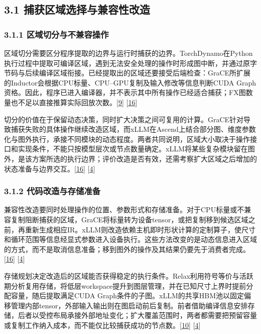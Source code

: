 \documentclass[
  11pt,
  UTF8]{ctexart}
\begin{document}
\hypertarget{section-3-1}{%
\subsection{3.1 捕获区域选择与兼容性改造}\label{section-3-1}}

\hypertarget{section-3-1-1}{%
\subsubsection{3.1.1 区域切分与不兼容操作}\label{section-3-1-1}}

区域切分需要区分程序提取的边界与运行时捕获的边界。TorchDynamo在Python执行过程中提取可编译区域，遇到无法安全处理的操作时形成图中断，并通过原字节码与后续编译区域衔接。已经提取出的区域还要接受后端检查：GraCE所扩展的Inductor会根据CPU标量、CPU--GPU复制及输入修改等信息判断CUDA
Graph资格。因此，程序已进入编译器，并不表示其中所有操作已经适合捕获；FX图数量也不足以直接推算实际回放次数。{[}\protect\hyperlink{ref-ansel2024pytorch2}{9}{]}
{[}\protect\hyperlink{ref-ghosh2026grace}{16}{]}

切分的价值在于保留动态决策，同时扩大决策之间可复用的计算。GraCE针对导致捕获失败的具体操作继续改造区域，而xLLM在Ascend上结合部分图、维度参数化与图外执行，承接不同模块的动态程度。两者共同说明，区域大小取决于操作接口和实现条件，不能只按模型层次或节点数量确定。xLLM将某些复杂模块留在图外，是该方案所选的执行边界；评价改造是否有效，还需考察扩大区域之后增加的状态准备与边界交互。{[}\protect\hyperlink{ref-ghosh2026grace}{16}{]}
{[}\protect\hyperlink{ref-liu2025xllm}{4}{]}

\hypertarget{section-3-1-2}{%
\subsubsection{3.1.2 代码改造与存储准备}\label{section-3-1-2}}

兼容性改造要同时处理操作的位置、参数形式和存储准备。对于CPU标量或不兼容复制阻断捕获的区域，GraCE将标量转为设备tensor，或把复制移到候选区域之前，再重新生成相应IR。xLLM则改造依赖主机即时形状计算的定制算子，使尺寸和循环范围等信息经显式参数进入设备执行。这些方法改变的是动态信息进入区域的方式，而不是取消信息准备；移到图外的操作及其结果仍要先于消费者完成。{[}\protect\hyperlink{ref-ghosh2026grace}{16}{]}
{[}\protect\hyperlink{ref-liu2025xllm}{4}{]}

存储规划决定改造后的区域能否获得稳定的执行条件。Relax利用符号等价与活跃期分析复用存储，将低层workspace提升到图层管理，并在已知尺寸上界时提前分配容量，随后提取满足CUDA
Graph条件的子图。xLLM的共享HBM池以固定偏移管理内部tensor，外部输入输出则在图启动前后复制。前者借助编译信息安排存储，后者以受控布局承接外部地址变化；扩大覆盖范围时，两者都需要把预留容量或复制工作纳入成本，而不能仅比较捕获成功的节点数。{[}\protect\hyperlink{ref-lai2025relax}{10}{]}
{[}\protect\hyperlink{ref-liu2025xllm}{4}{]}
\end{document}
